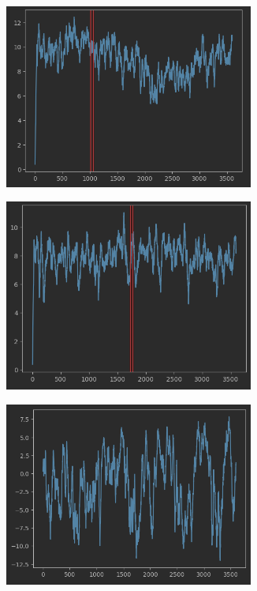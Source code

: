 \begin{figure}[H]
\centering
\begin{subfigure}{0.5\textwidth}
  \centering
  \includegraphics[width=0.9\textwidth]{images/f2-1.png}
  \caption{}
  \label{real_sub1}
\end{subfigure}%
\begin{subfigure}{0.5\textwidth}
  \centering
  \includegraphics[width=0.9\textwidth]{images/f2-2.png}
  \caption{}
  \label{real_sub2}
\end{subfigure}
\begin{subfigure}{0.5\textwidth}
  \centering
  \includegraphics[width=0.9\textwidth]{images/f2-3.png}

\end{subfigure}
\end{figure}
